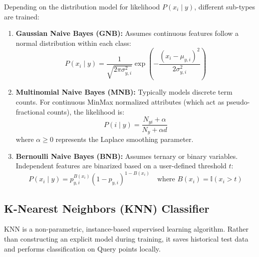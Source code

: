 \documentclass[12pt,a4paper]{article}
\begin{document}
Depending on the distribution model for likelihood $P(x_i \mid y)$, different sub-types are trained:
\begin{enumerate}
    \item \textbf{Gaussian Naive Bayes (GNB):} Assumes continuous features follow a normal distribution within each class:
    \begin{equation}
        P(x_i \mid y) = \frac{1}{\sqrt{2\pi\sigma_{y,i}^2}} \exp\left( - \frac{(x_i - \mu_{y,i})^2}{2\sigma_{y,i}^2} \right)
    \end{equation}
    \item \textbf{Multinomial Naive Bayes (MNB):} Typically models discrete term counts. For continuous MinMax normalized attributes (which act as pseudo-fractional counts), the likelihood is:
    \begin{equation}
        P(i \mid y) = \frac{N_{yi} + \alpha}{N_y + \alpha d}
    \end{equation}
    where $\alpha \ge 0$ represents the Laplace smoothing parameter.
    \item \textbf{Bernoulli Naive Bayes (BNB):} Assumes ternary or binary variables. Independent features are binarized based on a user-defined threshold $t$:
    \begin{equation}
        P(x_i \mid y) = p_{y,i}^{B(x_i)} (1 - p_{y,i})^{1 - B(x_i)} \quad \text{where } B(x_i) = \mathbb{I}(x_i > t)
    \end{equation}
\end{enumerate}

\subsection{K-Nearest Neighbors (KNN) Classifier}
KNN is a non-parametric, instance-based supervised learning algorithm. Rather than constructing an explicit model during training, it saves historical test data and performs classification on Query points locally.
\end{document}
